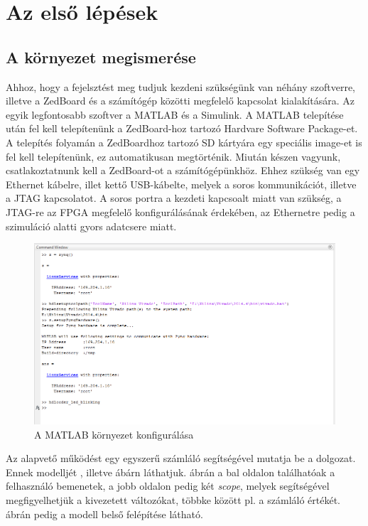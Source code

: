 \chapter*{Az első lépések}

\section{A környezet megismerése}

Ahhoz, hogy a fejelsztést meg tudjuk kezdeni szükségünk van néhány szoftverre, illetve a ZedBoard és a számítógép közötti megfelelő kapcsolat kialakítására. Az egyik legfontosabb szoftver a MATLAB és a Simulink. A MATLAB telepítése után fel kell telepítenünk a ZedBoard-hoz tartozó Hardvare Software Package-et. A telepítés folyamán a ZedBoardhoz tartozó SD kártyára egy speciális image-et is fel kell telepítenünk, ez automatikusan megtörténik. Miután készen vagyunk, csatlakoztatnunk kell a ZedBoard-ot a számítógépünkhöz. Ehhez szükség van egy Ethernet kábelre, illet kettő USB-kábelte, melyek a soros kommunikációt, illetve a JTAG kapcsolatot. A soros portra a kezdeti kapcsoalt miatt van szükség, a JTAG-re az FPGA megfelelő konfigurálásának érdekében, az Ethernetre pedig a szimuláció alatti gyors adatcsere miatt. 

\begin{figure}[!ht]
	\centering
	\includegraphics[width = \textwidth]{figures/matlab_1_setup.png}
	\caption{A MATLAB környezet konfigurálása} 
	\label{fig:matlabconf}
\end{figure}

Az alapvető működést egy egyszerű számláló segítségével mutatja be a dolgozat. Ennek modelljét , illetve  ábárn láthatjuk.  ábrán a bal oldalon találhatóak a felhasználó bemenetek, a jobb oldalon pedig két \emph{scope}, melyek segítségével megfigyelhetjük a kivezetett változókat, többke között pl. a számláló értékét.  ábrán pedig a modell belső felépítése látható.


